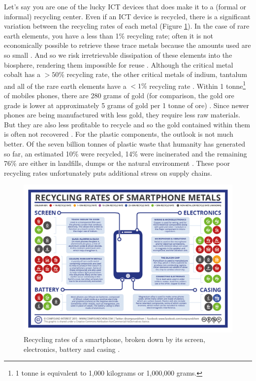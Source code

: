 \documentclass{article}
\newcounter{subsubsubsection}[subsubsection]
\begin{document}
{} \label{SECTION_HOW_RECYCLABLE_ARE_MY_RECYCLABLES}
Let's say you are one of the lucky ICT devices that does make it to a (formal or informal) recycling center. Even if an ICT device is recycled, there is a significant variation between the recycling rates of each metal (Figure \ref{Recycling_Rates_Smartphone}). In the case of rare earth elements, you have a less than 1\% recycling rate; often it is not economically possible to retrieve these trace metals because the amounts used are so small \cite{physorg2012scarcemetals, habib2015tracking}. And so we risk irretrievable dissipation of these elements into the biosphere, rendering them impossible for reuse \cite{reller2009mobile}. Although the critical metal cobalt has a $>50\%$ recycling rate, the other critical metals of indium, tantalum and all of the rare earth elements have a $<1\%$ recycling rate \cite{compoundinterest2014}. Within 1 tonne\footnote{1 tonne is equivalent to 1,000 kilograms or 1,000,000 grams.} of mobiles phones, there are 280 grams of gold \cite{forti2020global} (for comparison, the gold ore grade is lower at approximately 5 grams of gold per 1 tonne of ore) \cite{mudd2007sustainability}. Since newer phones are being manufactured with less gold, they require less raw materials. But they are also less profitable to recycle and so the gold contained within them is often not recovered \cite{geyer2010economics}. For the plastic components, the outlook is not much better. Of the seven billion tonnes of plastic waste that humanity has generated so far, an estimated 10\% were recycled, 14\% were incinerated and the remaining 76\% are either in landfills, dumps or the natural environment \cite{geyer2020production}. These poor recycling rates unfortunately puts additional stress on supply chains.

\begin{figure}[h]
    \includegraphics[width=1 \textwidth]{./images/recycling_rates_of_smartphone.png}
    \centering
    \caption{Recycling rates of a smartphone, broken down by its screen, electronics, battery and casing \cite{compoundinterest2014}.}
    \label{Recycling_Rates_Smartphone}
\end{figure}
\end{document}
